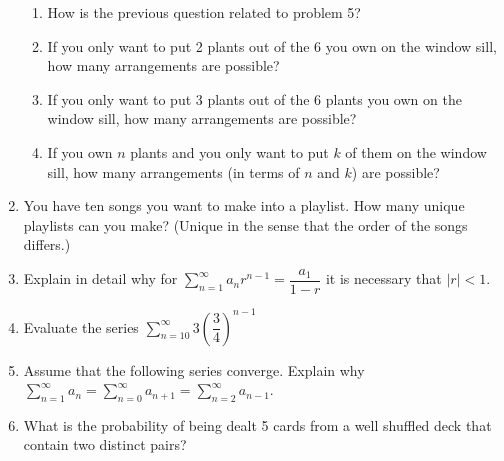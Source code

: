 \documentclass[12pt]{article}
\theoremstyle{plain}     %
\begin{document}
\begin{enumerate}
\begin{enumerate}
			\item How is the previous question related to problem 5?\\[1cm]
			\item If you only want to put 2 plants out of the 6 you own on the window sill, how many arrangements are possible?\\[1cm]
			\item If you only want to put 3 plants out of the 6 plants you own on the window sill, how many arrangements are possible?\\[1.5cm]
			\item If you own $n$ plants and you only want to put $k$ of them on the window sill, how many arrangements (in terms of $n$ and $k$) are possible?\\[2cm]
		\end{enumerate}
	\item You have ten songs you want to make into a playlist. How many unique playlists can you make? (Unique in the sense that the order of the songs differs.)\\[1cm]
	\newpage
	\item Explain in detail why for $\displaystyle \sum \limits_{n=1}^\infty a_nr^{n-1}= \dfrac{a_1}{1-r}$ it is necessary that $|r|<1$.\\[6cm]
	\item Evaluate the series $\displaystyle \sum \limits_{n=10}^\infty 3\left(\dfrac{3}{4}\right)^{n-1}$\\[6cm]
	\item Assume that the following series converge. Explain why $\displaystyle \sum \limits_{n=1}^\infty a_n =\sum \limits_{n=0}^\infty a_{n+1}=\sum \limits_{n=2}^\infty a_{n-1}$.\\[3cm]
	
	\item What is the probability of being dealt 5 cards from a well shuffled deck that contain two distinct pairs?
	
\end{enumerate}
	
\end{document}

